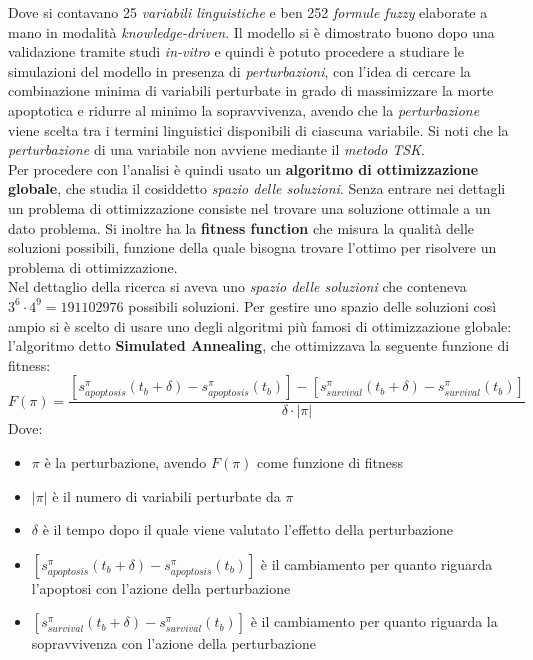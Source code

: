 \documentclass[a4paper,12pt, oneside]{book}
\begin{document}
Dove si contavano 25 \textit{variabili linguistiche} e ben 252 \textit{formule
  fuzzy} elaborate a mano in modalità \textit{knowledge-driven}. Il modello si
è dimostrato buono dopo una validazione tramite studi \textit{in-vitro} e quindi
è potuto procedere a studiare le simulazioni del modello in presenza di
\textit{perturbazioni}, con l'idea di cercare la combinazione minima di
variabili perturbate in grado di massimizzare la morte apoptotica e ridurre al
minimo la sopravvivenza, avendo che la \textit{perturbazione} viene scelta tra i
termini linguistici disponibili di ciascuna variabile. Si noti che la
\textit{perturbazione} di una variabile non avviene mediante il \textit{metodo
  TSK}.\\
Per procedere con l'analisi è quindi usato un \textbf{algoritmo di
  ottimizzazione globale}, che studia il cosiddetto \textit{spazio delle
  soluzioni}. Senza entrare nei dettagli un problema di
ottimizzazione consiste nel trovare una soluzione ottimale a un dato
problema. Si inoltre ha la \textbf{fitness function} che misura la qualità delle
soluzioni possibili, funzione della quale bisogna trovare l'ottimo per risolvere
un problema di ottimizzazione. \\
Nel dettaglio della ricerca si aveva uno \textit{spazio delle soluzioni} che
conteneva $3^6 \cdot 4^9 = 191102976$ possibili soluzioni. Per gestire uno
spazio delle soluzioni così ampio si è scelto di usare uno degli algoritmi più
famosi di ottimizzazione globale: l'algoritmo detto \textbf{Simulated
  Annealing}, che ottimizzava la seguente funzione di fitness:
{\small{\[F(\pi)=\frac{\left[s_{apoptosis}^\pi(t_b+\delta)-
          s_{apoptosis}^\pi(t_b)\right] -\left[s_{survival}^\pi(t_b+\delta)-
          s_{survival}^\pi(t_b)\right]}{\delta\cdot|\pi|}\] }}
Dove:
\begin{itemize}
  \item $\pi$ è la perturbazione, avendo $F(\pi)$ come funzione di fitness
  \item $|\pi|$ è il numero di variabili perturbate da $\pi$
  \item $\delta$ è il tempo dopo il quale viene valutato l'effetto della
  perturbazione 
  \item $\left[s_{apoptosis}^\pi(t_b+\delta)-s_{apoptosis}^\pi(t_b)\right]$ è
  il cambiamento per quanto riguarda l'apoptosi con l'azione della
  perturbazione
  \item $\left[s_{survival}^\pi(t_b+\delta)-s_{survival}^\pi(t_b)\right]$ è
  il cambiamento per quanto riguarda la sopravvivenza con l'azione della
  perturbazione
\end{itemize}
\end{document}

